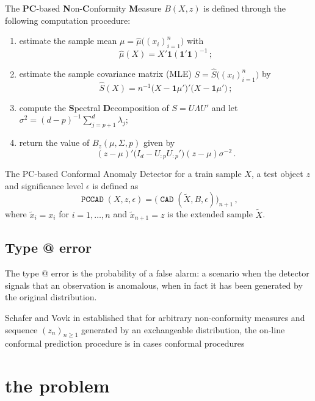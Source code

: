 \documentclass[a4paper,14pt]{article}
\makeatletter
\newcommand{\one}{\mathbf{1}}
\newcommand*{\rom}[1]{\expandafter\@slowromancap\romannumeral #1@}
\makeatother
\begin{document}
The \textbf{PC}-based \textbf{N}on-\textbf{C}onformity \textbf{M}easure $B(X,z)$
is defined through the following computation procedure:
\begin{enumerate}
    \item estimate the sample mean $\mu = \hat{\mu}\bigl((x_i)_{i=1}^n\bigr)$ with
        $$ \hat{\mu}(X) = X'\one (\one'\one)^{-1}\,;$$
    \item estimate the sample covariance matrix (MLE) $S = \hat{S}\bigl((x_i)_{i=1}^n\bigr)$
        by
        $$ \hat{S}(X) = n^{-1} \bigl(X - \one\mu'\bigr)'\bigl(X - \one\mu'\bigr) \,;$$
    \item compute the \textbf{S}pectral \textbf{D}ecomposition of $S = U \Lambda U'$ and
        let $\sigma^2 = (d-p)^{-1}\sum_{j=p+1}^d \lambda_j$;
    \item return the value of $B_z(\mu, \Sigma, p)$ given by
        $$ (z-\mu)'\bigl(I_d - U_{:p} U_{:p}'\bigr) (z-\mu) \sigma^{-2} \,.$$
\end{enumerate}

The PC-based Conformal Anomaly Detector for a train sample $X$, a test object $z$
and significance level $\epsilon$ is defined as 
$$ \mathop{\mathtt{PCCAD}}\nolimits(X, z, \epsilon)
    = \bigl(\mathop{\mathtt{CAD}}\nolimits(\tilde{X}, B, \epsilon)\bigr)_{n+1}
    \,,$$
where $\tilde{x}_i = x_i$ for $i=1,\ldots, n$ and $\tilde{x}_{n+1} = z$ is the extended
sample $\tilde{X}$.

\subsection{Type \rom{1} error} %
\label{sub:type_1_error}

The type \rom{1} error is the probability of a false alarm: a scenario when the detector
signals that an observation is anomalous, when in fact it has been generated by
the original distribution.

Schafer and Vovk in \cite{vovk2005} established that for arbitrary non-conformity measures and
sequence $(z_n)_{n\geq1}$ generated by an exchangeable distribution, the on-line
conformal prediction procedure is 
in cases conformal procedures



\section{the problem} %
\label{sec:the_problem}
\end{document}
